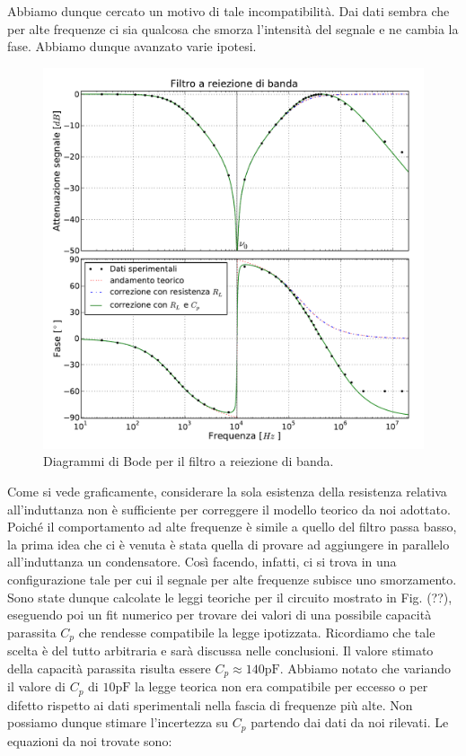 Abbiamo dunque cercato un motivo di tale incompatibilità. Dai dati sembra che per alte frequenze ci sia qualcosa che smorza l'intensità del segnale e ne cambia la fase. Abbiamo dunque avanzato varie ipotesi.

\begin{figure}
    \includegraphics[width=120mm]{notch.pdf}
    \caption{Diagrammi di Bode per il filtro a reiezione di banda.}
    \label{fig:notch}
\end{figure}


Come si vede graficamente, considerare la sola esistenza della resistenza relativa all'induttanza non è sufficiente per correggere il modello teorico da noi adottato.
Poiché il comportamento ad alte frequenze è simile a quello del filtro passa basso, la prima idea che ci è venuta è stata quella di provare ad aggiungere in parallelo all'induttanza un condensatore. Così facendo, infatti, ci si trova in una configurazione tale per cui il segnale per alte frequenze subisce uno smorzamento. Sono state dunque calcolate le leggi teoriche per il circuito mostrato in Fig. (??), eseguendo poi un fit numerico per trovare dei valori di una possibile capacità parassita $C_p$ che rendesse compatibile la legge ipotizzata. Ricordiamo che tale scelta è del tutto arbitraria e sarà discussa nelle conclusioni. Il valore stimato della capacità parassita risulta essere $C_p \approx 140 \si{\pico\farad}$. Abbiamo notato che variando il valore di $C_p$ di $10 \si{\pico\farad}$ la legge teorica non era compatibile per eccesso o per difetto rispetto ai dati sperimentali nella fascia di frequenze più alte. Non possiamo dunque stimare l'incertezza su $C_p$ partendo dai dati da noi rilevati. Le equazioni da noi trovate sono:

